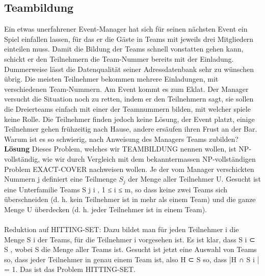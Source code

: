 \subsection{Teambildung}
Ein etwas unerfahrener Event-Manager hat sich für seinen nächsten Event ein Spiel einfallen lassen, für das er die Gäste in Teams mit jeweils drei Mitgliedern einteilen muss. Damit die Bildung der Teams schnell vonstatten gehen kann, schickt er den Teilnehmern die Team-Nummer bereits mit der Einladung. Dummerweise lässt die Datenqualität seiner Adressdatenbank sehr zu wünschen übrig. Die meisten Teilnehmer bekommen mehrere Einladungen, mit verschiedenen Team-Nummern. Am Event kommt es zum Eklat. Der Manager versucht die Situation noch zu retten, indem er den Teilnehmern sagt, sie sollen die Dreierteams einfach mit einer der Teamnummern bilden, mit welcher spiele keine Rolle. Die Teilnehmer finden jedoch keine Lösung, der Event platzt, einige Teilnehmer gehen frühzeitig nach Hause, andere ersäufen ihren Frust an der Bar. Warum ist es so schwierig, nach Anweisung des Managers Teams zubilden?
\\
\textbf{Lösung}
Dieses Problem, welches wir TEAMBILDUNG nennen wollen, ist NP-vollständig, wie wir durch Vergleich mit dem bekanntermassen NP-vollständigen Problem EXACT-COVER nachweisen wollen. Je der vom Manager verschickten Nummern j definiert eine Teilmenge $S_j$ der Menge aller Teilnehmer U. Gesucht ist eine Unterfamilie Teams S j i , 1 ≤ i ≤ m, so dass keine zwei Teams sich überschneiden (d. h. kein Teilnehmer ist in mehr als einem Team) und die ganze Menge U überdecken (d. h. jeder Teilnehmer ist in einem Team). \\
\\
Reduktion auf HITTING-SET: Dazu bildet man für jeden Teilnehmer i die Menge S i der Teams, für die Teilnehmer i vorgesehen ist. Es ist klar, dass S i ⊂ S , wobei S die Menge aller Teams ist. Gesucht ist jetzt eine Auswahl von Teams so, dass jeder Teilnehmer in genau einem Team ist, also H ⊂ S so, dass |H ∩ S i | = 1. Das ist das Problem HITTING-SET.

